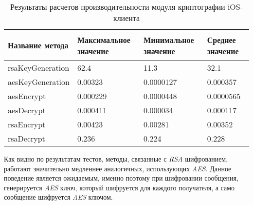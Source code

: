 \begin{table}[!ht]
  \caption{Результаты расчетов производительности модуля криптографии iOS-клиента}
  \label{sec:eng:performance:aesenc:result}
  \centering
  \begin{tabularx}{\linewidth}{
    |>{\hsize=1.6\hsize}X|
    >{\centering\arraybackslash\hsize=0.8\hsize}X|
    >{\centering\arraybackslash\hsize=0.8\hsize}X|
    >{\centering\arraybackslash\hsize=0.8\hsize}X|
  }
	\hline
 \begin{center}Название метода\end{center} & Максимальное значение &  Минимальное значение &  Среднее значение \\
 \hline
 rsaKeyGeneration & \num{62.4} & \num{11.3} & \num{32.1} \\
 \hline
 aesKeyGeneration & \num{0.00323} & \num{0.0000127} & \num{0.000357} \\
 \hline
 aesEncrypt & \num{0.000229} & \num{0.0000448} & \num{0.0000565} \\
 \hline
 aesDecrypt & \num{0.000411} & \num{0.000034} & \num{0.000117} \\
 \hline
 rsaEncrypt & \num{0.00423} & \num{0.00281} & \num{0.00352} \\
 \hline
 rsaDecrypt & \num{0.236} & \num{0.224} & \num{0.228} \\
 \hline
  \end{tabularx}
\end{table}

Как видно по результатам тестов, методы, связанные с \textit{RSA} шифрованием, работают значительно медленнее аналогичных, использующих \textit{AES}. Данное поведение является ожидаемым, именно поэтому при шифровании сообщения, генерируется \textit{AES} ключ, который шифруется для каждого получателя, а само сообщение шифруется \textit{AES} ключом.